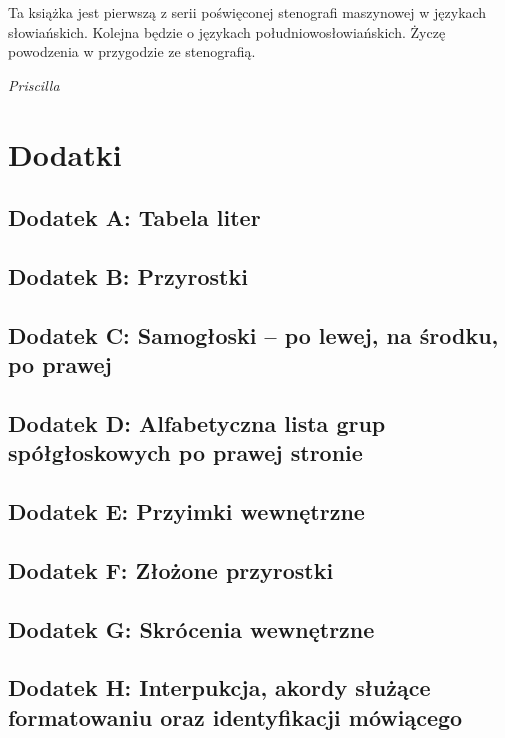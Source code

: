 \documentclass[12p, oneside]{book}
\begin{document}
Ta książka jest pierwszą z serii poświęconej stenografi maszynowej w językach słowiańskich. Kolejna będzie o językach południowosłowiańskich. Życzę powodzenia w przygodzie ze stenografią.

{\em Priscilla}
\appendix
\chapter{Dodatki}
\section{Dodatek A: Tabela liter}
\newpage
\section{Dodatek B: Przyrostki}
\newpage
\section{Dodatek C: Samogłoski -- po lewej, na środku, po prawej}
\newpage
\section{Dodatek D: Alfabetyczna lista grup spółgłoskowych po prawej stronie}
\newpage
\section{Dodatek E: Przyimki wewnętrzne}
\newpage
\section{Dodatek F: Złożone przyrostki}
\newpage
\section{Dodatek G: Skrócenia wewnętrzne}
\newpage
\section{Dodatek H: Interpukcja, akordy służące formatowaniu oraz identyfikacji mówiącego}
\end{document}
